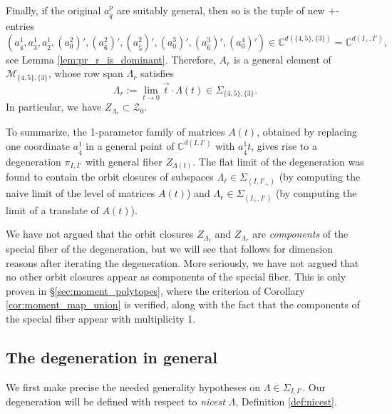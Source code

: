 \documentclass[12pt]{amsart}
\newcommand{\bC}{\mathbb{C}}
\newcommand{\cM}{\mathcal{M}}
\newcommand{\cZ}{\mathcal{Z}}
\newcommand{\barq}{\overline{q}}
\newcommand{\vectt}{\overrightarrow{t}}
\begin{document}
Finally, if the original $a^p_{\barq}$ are suitably general, then so is the tuple of new $+$-entries
\begin{equation*}
(a^1_{\bar4},a^1_{\bar3} , a^1_{\bar2},(a^2_0)',  (a^2_{\bar6})' , (a^2_{\bar5})',(a^3_0)' , (a^3_{\bar6})',(a^4_0)')\in \bC^{d(\{4,5\},\{3\})}=\bC^{d(I_+,I')},
\end{equation*}
see Lemma \ref{lem:pr_r_is_dominant}. Therefore, $A_r$ is a general element of $\cM_{\{4,5\},\{3\}}$, whose row span $\Lambda_r$ satisfies
\begin{equation*}
    \Lambda_r:=\lim_{t\to 0}\vectt \cdot \Lambda(t)\in\Sigma_{\{4,5\},\{3\}}.
\end{equation*}
In particular, we have $Z_{\Lambda_r}\subset\cZ_0$.

To summarize, the 1-parameter family of matrices $A(t)$, obtained by replacing one coordinate $a^1_{\bar4}$ in a general point of $\bC^{d(I,I')}$ with $a^1_{\bar4}t$, gives rise to a degeneration $\pi_{I,I'}$ with general fiber $Z_{\Lambda(t)}$. The flat limit of the degeneration was found to contain the orbit closures of subspaces $\Lambda_\ell\in\Sigma_{(I,I'_+)}$ (by computing the naive limit of the level of matrices $A(t)$) and $\Lambda_r\in\Sigma_{(I_+,I')}$ (by computing the limit of a translate of $A(t)$).

We have not argued that the orbit closures $Z_{\Lambda_\ell}$ and $Z_{\Lambda_r}$ are \emph{components} of the special fiber of the degeneration, but we will see that follows for dimension reasons after iterating the degeneration. More seriously, we have not argued that no other orbit closures appear as components of the special fiber. This is only proven in \S\ref{sec:moment_polytopes}, where the criterion of Corollary \ref{cor:moment_map_union} is verified, along with the fact that the components of the special fiber appear with multiplicity 1.

\subsection{The degeneration in general}\label{sec:degen_real}

We first make precise the needed generality hypotheses on $\Lambda\in\Sigma_{I,I'}$. Our degeneration will be defined with respect to \emph{nicest} $\Lambda$, Definition \ref{def:nicest}.
\end{document}
